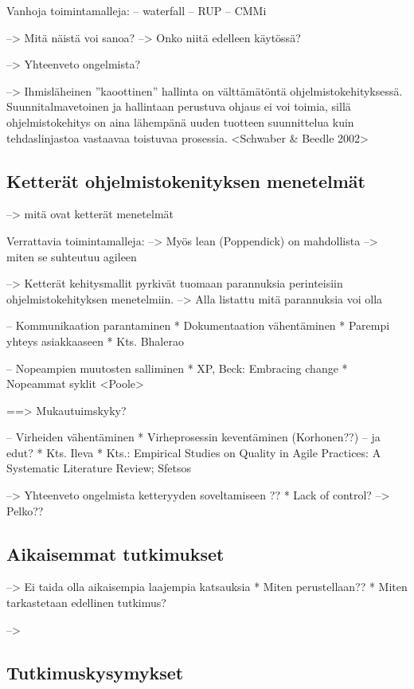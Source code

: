 Vanhoja toimintamalleja:
-- waterfall
-- RUP
-- CMMi

--> Mitä näistä voi sanoa? --> Onko niitä edelleen käytössä?

--> Yhteenveto ongelmista?

--> Ihmisläheinen ''kaoottinen'' hallinta on välttämätöntä ohjelmistokehityksessä.
Suunnitalmavetoinen ja hallintaan perustuva ohjaus ei voi toimia, sillä
ohjelmistokehitys on aina lähempänä uuden tuotteen suunnittelua kuin
tehdaslinjastoa vastaavaa toistuvaa prosessia. <Schwaber \& Beedle 2002>


\subsection{Ketterät ohjelmistokenityksen menetelmät}

--> mitä ovat ketterät menetelmät

Verrattavia toimintamalleja:
--> Myös lean (Poppendick) on mahdollista
--> miten se suhteutuu agileen


--> Ketterät kehitysmallit pyrkivät tuomaan parannuksia perinteisiin
ohjelmistokehityksen menetelmiin. --> Alla listattu mitä parannuksia voi olla

-- Kommunikaation parantaminen
  * Dokumentaation vähentäminen
  * Parempi yhteys asiakkaaseen
  * Kts. Bhalerao

-- Nopeampien muutosten salliminen
  * XP, Beck: Embracing change
  * Nopeammat syklit <Poole>

==> Mukautuimskyky?

-- Virheiden vähentäminen
  * Virheprosessin keventäminen (Korhonen??) -- ja edut?
  * Kts. Ileva
  * Kts.: Empirical Studies on Quality in Agile Practices: A Systematic Literature Review; Sfetsos

--> Yhteenveto ongelmista ketteryyden soveltamiseen ??
  * Lack of control? --> Pelko??


\subsection{Aikaisemmat tutkimukset}

--> Ei taida olla aikaisempia laajempia katsauksia
    * Miten perustellaan??
    * Miten tarkastetaan edellinen tutkimus?
    
--> 

\subsection{Tutkimuskysymykset}


